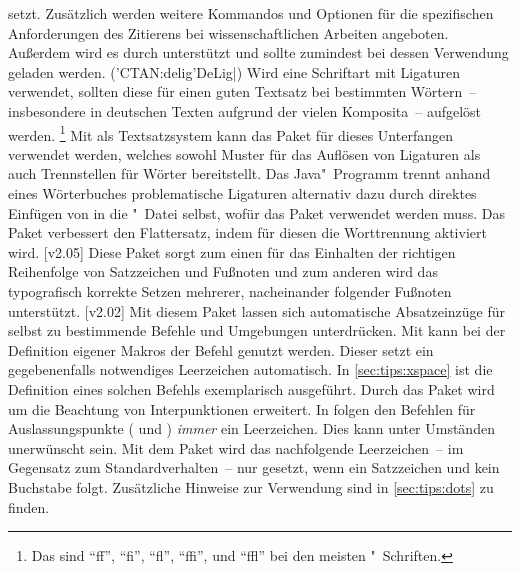 \begin{DeclarePackages}
  setzt. Zusätzlich werden weitere Kommandos und Optionen für die spezifischen 
  Anforderungen des Zitierens bei wissenschaftlichen Arbeiten angeboten. 
  Außerdem wird es durch  unterstützt und sollte zumindest 
  bei dessen Verwendung geladen werden.
(\Application'CTAN:delig'{DeLig|})
  Wird eine Schriftart mit Ligaturen verwendet, sollten diese für einen guten 
  Textsatz bei bestimmten Wörtern~-- insbesondere in deutschen Texten aufgrund 
  der vielen Komposita~-- aufgelöst werden.%
  \footnote{%
    Das sind \enquote{ff}, \enquote{fi}, \enquote{fl}, \enquote{ffi}, und 
    \enquote{ffl} bei den meisten "~Schriften.%
  }
  Mit  als Textsatzsystem kann das Paket  
  für dieses Unterfangen verwendet werden, welches sowohl Muster für das 
  Auflösen von Ligaturen als auch Trennstellen für Wörter bereitstellt. 
  Das Java"~Programm  trennt anhand eines Wörterbuches 
  problematische Ligaturen alternativ dazu durch direktes Einfügen von 
   in die "~Datei selbst, wofür das Paket 
   verwendet werden muss.
  Das Paket verbessert den Flattersatz, indem für diesen die Worttrennung 
  aktiviert wird.
[v2.05]
  Diese Paket sorgt zum einen für das Einhalten der richtigen Reihenfolge von 
  Satzzeichen und Fußnoten und zum anderen wird das typografisch korrekte 
  Setzen mehrerer, nacheinander folgender Fußnoten unterstützt. 
[v2.02]
  Mit diesem Paket lassen sich automatische Absatzeinzüge für selbst zu 
  bestimmende Befehle und Umgebungen unterdrücken.
  Mit  kann bei der Definition eigener Makros der Befehl 
   genutzt werden. Dieser setzt ein gegebenenfalls notwendiges 
  Leerzeichen automatisch. In \autoref{sec:tips:xspace} ist die Definition 
  eines solchen Befehls exemplarisch ausgeführt. Durch das Paket 
   wird  um die Beachtung von 
  Interpunktionen erweitert.
  In  folgen den Befehlen für Auslassungspunkte ( und 
  ) \emph{immer} ein Leerzeichen. Dies kann unter Umständen 
  unerwünscht sein. Mit dem Paket  wird das nachfolgende 
  Leerzeichen~-- im Gegensatz zum Standardverhalten~-- nur gesetzt, wenn ein 
  Satzzeichen und kein Buchstabe folgt. Zusätzliche Hinweise zur Verwendung 
  sind in \autoref{sec:tips:dots} zu finden.
\end{DeclarePackages}
%



